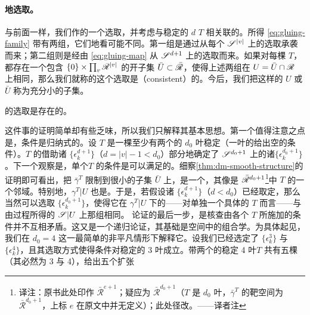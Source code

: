 \paragraph{\trConsistent{}地选取\trStriplikeEnd。}\label{sub:consistent-striplike-ends}
与前面一样，我们作\trStriplikeEnd{}的一个\trUniversal{}选取，并考虑与稳定的 $d$ \trLeafedTree{}$T$ 相关联的\trGluingConstruction。所得\trFamily{} \eqref{eq:gluing-family} 带有两组\trStriplikeEnd，它们\trApriori{}地看可能不同。第一组是通过\trGluingConstruction{}从每个 $\mathscr{S}^{|v|}$ 上的\trUniversal{}选取承袭而来；第二组则是经由\trClassifyingMap{} \eqref{eq:gluing-map} 从 $\mathscr{S}^{d+1}$ 上的\trUniversal{}选取\trPullback{}而来。如果对每棵 $T$，都存在一个包含 $\{0\}\times\prod_v\mathscr{R}^{|v|}$ 的开子集 $\bar{U}\subset\bar{\mathscr{R}}$，使得上述两组\trStriplikeEnd{}在 $U=\bar{U}\cap\mathscr{R}$ 上相同，那么我们就称\trStriplikeEnd{}的这个\trUniversal{}选取是\textbf{\trConsistent}（consistent）的。今后，我们把这样的 $U$ 或 $\bar{U}$ 称为\trGluingParameter{}充分小的子集。
\begin{lemma}\label{thm:consistent-ends-exist}
\trStriplikeEnd{}的\trConsistent{}\trUniversal{}选取是存在的。
\end{lemma}
这件事的证明简单却有些乏味，所以我们只解释其基本思想。第一个值得注意之点是，\trConsistency{}条件是归纳式的。设 $T$ 是一棵至少有两个\trVertex{}的 $d_0$ 叶稳定\trTree（一叶的\trLeafedTree{}给出空的\trConsistency{}条件）。$T$ 的\trConsistency{}借助诸 $\{\epsilon^{d+1}_k\}$（$d=|v|-1<d_0$）部分地确定了 $\mathscr{S}^{d_0+1}$ 上的诸\trStriplikeEnd{}$\{\epsilon^{d_0+1}_k\}$。下一个观察是，单个\trTree{}$T$ 的\trConsistency{}条件是可以满足的。细察\cref{thm:dm-smooth-structure}的证明即可看出，把 $\bar\gamma^T$ 限制到\trGluingParameter{}很小的子集 $\bar{U}$ 上，是一个\trOpenEmbedding，其像是 $\bar{\mathscr{R}}^{d_0+1}$\footnote{译注：原书此处印作 $\bar{\mathscr{R}}^{e+1}$；疑应为 $\bar{\mathscr{R}}^{d_0+1}$（$T$ 是 $d_0$ 叶\trTree{}，$\bar\gamma^T$ 的靶空间为 $\bar{\mathscr{R}}^{d_0+1}$，上标 $e$ 在原文中并无定义）；此处径改。——译者注}中 $T$ \trStratum{}的一个邻域。特别地，$\gamma^T|U$ 也是\trEmbedding。于是，若假设诸 $\{\epsilon^{d+1}_k\}$（$d<d_0$）已经取定，那么当然可以选取 $\{\epsilon^{d_0+1}_k\}$，使得它在 $\gamma^T|U$ 下的\trPullback——对单独一个具体的 $T$ 而言——与由\trGluing{}过程所得的 $\mathscr{S}|U$ 上那组\trStriplikeEnd{}相同。
论证的最后一步，是核查由各个 $T$ 所施加的条件并不互相矛盾。这又是一个递归论证，其基础是\trDeligneMumfordStasheff{}空间中\trBoundaryStratum{}的组合学。为具体起见，我们在 $d_0=4$ 这一最简单的非平凡情形下解释它。设我们已经选定了 $\{\epsilon^3_k\}$ 与 $\{\epsilon^4_k\}$，且其选取方式使得\trConsistency{}条件对稳定的 3 叶\trTree{}成立。带两个\trVertex{}的稳定 4 叶\trTree{}$T$ 共有五棵（其\trValency{}必然为 3 与 4），给出五个扩张\trGluingMap
